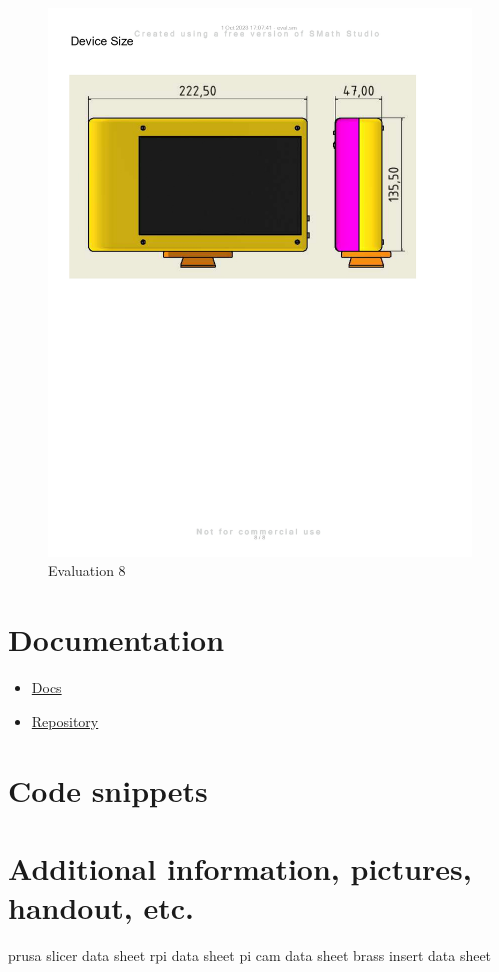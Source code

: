 \begin{figure}[H]
    \centering
    \includegraphics[width=\linewidth]{texs/appendix/data/evaluation/eval_page-0008.jpg}
    \caption{Evaluation 8}
    \label{fig:evaluation-8}
\end{figure}



\section{Documentation}

\begin{itemize}
    \item \href{https://haziqsabtu.github.io/SpeedCameraPi/}{Docs}
    \item \href{https://github.com/HaziqSabtu/SpeedCameraPi}{Repository}
\end{itemize}

\section{Code snippets}
\section{Additional information, pictures, handout, etc.}
prusa slicer data sheet
rpi data sheet
pi cam data sheet
brass insert data sheet

